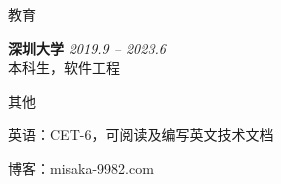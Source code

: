 \documentclass{resume}
\begin{document}



\begin{rSection}{教育}

{\textbf{深圳大学}} \hfill {\em 2019.9 -- 2023.6} \\
本科生，软件工程

\end{rSection}


\begin{rSection}{其他}

\begin{rSubsection}{}{}{}{}
\item[-] 英语：CET-6，可阅读及编写英文技术文档
\item[-] 博客：misaka-9982.com
\end{rSubsection}

\end{rSection}
\end{document}
